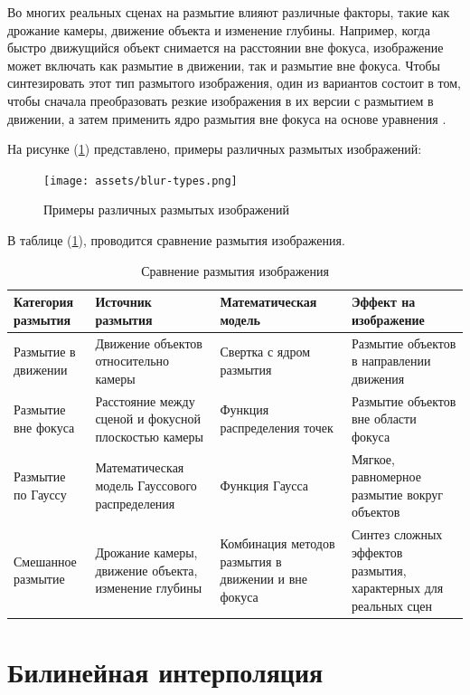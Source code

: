 Во многих реальных сценах на размытие влияют различные факторы, такие как дрожание камеры, движение объекта и изменение глубины. Например, когда быстро движущийся объект снимается на расстоянии вне фокуса, изображение может включать как размытие в движении, так и размытие вне фокуса. Чтобы синтезировать этот тип размытого изображения, один из вариантов состоит в том, чтобы сначала преобразовать резкие изображения в их версии с размытием в движении, а затем применить ядро размытия вне фокуса на основе уравнения \cite{zhang2020deblurring}.


На рисунке (\ref{fig:blur-types}) представлено, примеры различных размытых изображений: 
\begin{figure}[H]
	\centering
	\texttt{[image: assets/blur-types.png]}
	\caption{Примеры различных размытых изображений}
	\label{fig:blur-types}
\end{figure}

В таблице (\ref{tab:blur_comparison}), проводится сравнение размытия изображения.

\begin{table}[H]
    \centering
    \caption{Сравнение размытия изображения}
    \label{tab:blur_comparison}
    \begin{tabular}{|p{3cm}|p{4cm}|p{4cm}|p{4cm}|}
        \hline
        \textbf{Категория размытия} & \textbf{Источник размытия} & \textbf{Математическая модель} & \textbf{Эффект на изображение} \\ \hline
        Размытие в движении & Движение объектов относительно камеры & Свертка с ядром размытия & Размытие объектов в направлении движения \\ \hline
        Размытие вне фокуса & Расстояние между сценой и фокусной плоскостью камеры & Функция распределения точек & Размытие объектов вне области фокуса \\ \hline
        Размытие по Гауссу & Математическая модель Гауссового распределения & Функция Гаусса & Мягкое, равномерное размытие вокруг объектов \\ \hline
        Смешанное размытие & Дрожание камеры, движение объекта, изменение глубины & Комбинация методов размытия в движении и вне фокуса & Синтез сложных эффектов размытия, характерных для реальных сцен \\ \hline
    \end{tabular}
\end{table}

\section{Билинейная интерполяция}

